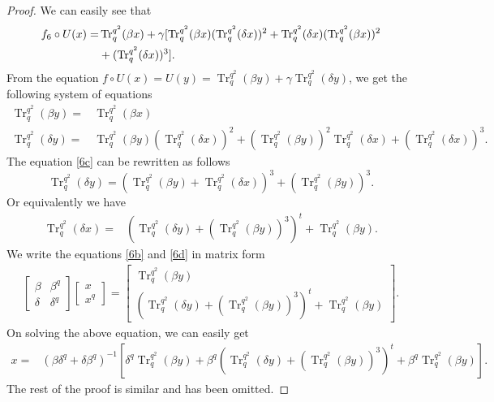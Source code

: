 \documentclass{birkjour}
\theoremstyle{definition}
\theoremstyle{remark}
\numberwithin{equation}{section}
\begin{document}
\begin{proof}
We can easily see that
	\begin{align}
		f_6\circ U(x) 
		=& \operatorname{Tr}_q^{q^2}(\beta x)+\gamma[\operatorname{Tr}_q^{q^2}(\beta x)(\operatorname{Tr}_q^{q^2}(\delta x))^2+\operatorname{Tr}_q^{q^2}(\delta x)(\operatorname{Tr}_q^{q^2}(\beta x))^2\notag \\
		&+(\operatorname{Tr}_q^{q^2}(\delta x))^3].\label{6a}
	\end{align}
	From the equation $f\circ U(x)=U(y)=\operatorname{Tr}_{q}^{q^2}(\beta y)+\gamma\operatorname{Tr}_{q}^{q^2}(\delta y)$, we get the following system of equations
	\begin{align}
	\operatorname{Tr}_q^{q^2}(\beta y)=&\operatorname{Tr}_q^{q^2}(\beta x)\label{6b}\\
	\operatorname{Tr}_q^{q^2}(\delta y)=&\operatorname{Tr}_q^{q^2}(\beta y)(\operatorname{Tr}_q^{q^2}(\delta x))^2+(\operatorname{Tr}_q^{q^2}(\beta y))^2\operatorname{Tr}_q^{q^2}(\delta x)+(\operatorname{Tr}_q^{q^2}(\delta x))^3.\label{6c}
	\end{align}
 The equation \ref{6c} can be rewritten as follows 
	$$\operatorname{Tr}_q^{q^2}(\delta y)=(\operatorname{Tr}_q^{q^2}(\beta y)+\operatorname{Tr}_q^{q^2}(\delta x))^3+(\operatorname{Tr}_q^{q^2}(\beta y))^3.$$
	Or equivalently we have
	\begin{align}
		\operatorname{Tr}_q^{q^2}(\delta x)=&(\operatorname{Tr}_q^{q^2}(\delta y)+(\operatorname{Tr}_q^{q^2}(\beta y))^3)^t+\operatorname{Tr}_q^{q^2}(\beta y).\label{6d}
	\end{align}
	We write the equations \ref{6b} and \ref{6d} in matrix form 
	\begin{align}
		\begin{bmatrix}
		\beta&\beta^{q}\\
		\delta&\delta^{q}
	\end{bmatrix}
	\begin{bmatrix}
		x\\x^{q}
	\end{bmatrix}=
	\begin{bmatrix}
		\operatorname{Tr}_{q}^{q^2}(\beta y)\\
		(\operatorname{Tr}_q^{q^2}(\delta y)+(\operatorname{Tr}_q^{q^2}(\beta y))^3)^t+\operatorname{Tr}_q^{q^2}(\beta y)
	\end{bmatrix}.
\end{align}
On solving the above equation, we can easily get 
	\begin{align}
		x=&(\beta\delta^q+\delta\beta^q)^{-1}[\delta^q\operatorname{Tr}_q^{q^2}(\beta y)+\beta^q(\operatorname{Tr}_q^{q^2}(\delta y)+(\operatorname{Tr}_q^{q^2}(\beta y))^3)^t+\beta^q\operatorname{Tr}_q^{q^2}(\beta y)].\label{6e}
	\end{align}
The rest of the proof is similar and has been omitted.

\end{proof}
\end{document}
